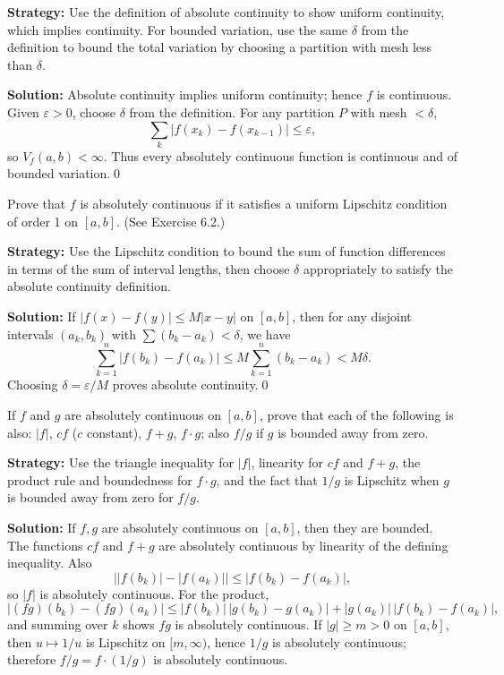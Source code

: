 \noindent\textbf{Strategy:} Use the definition of absolute continuity to show uniform continuity, which implies continuity. For bounded variation, use the same $\delta$ from the definition to bound the total variation by choosing a partition with mesh less than $\delta$.

\bigskip\noindent\textbf{Solution:}
Absolute continuity implies uniform continuity; hence $f$ is continuous. Given $\varepsilon>0$, choose $\delta$ from the definition. For any partition $P$ with mesh $<\delta$,
\[\sum_k |f(x_k)-f(x_{k-1})|\le\varepsilon,\]
so $V_f(a,b)<\infty$. Thus every absolutely continuous function is continuous and of bounded variation.\qed


\begin{problembox}
Prove that $f$ is absolutely continuous if it satisfies a uniform Lipschitz condition of order 1 on $[a, b]$. (See Exercise 6.2.)
\end{problembox}

\noindent\textbf{Strategy:} Use the Lipschitz condition to bound the sum of function differences in terms of the sum of interval lengths, then choose $\delta$ appropriately to satisfy the absolute continuity definition.

\bigskip\noindent\textbf{Solution:}
If $|f(x)-f(y)|\le M|x-y|$ on $[a,b]$, then for any disjoint intervals $(a_k,b_k)$ with $\sum(b_k-a_k)<\delta$, we have
\[\sum_{k=1}^n |f(b_k)-f(a_k)|\le M\sum_{k=1}^n(b_k-a_k)<M\delta.
\]
Choosing $\delta=\varepsilon/M$ proves absolute continuity.\qed


\begin{problembox}
If $f$ and $g$ are absolutely continuous on $[a, b]$, prove that each of the following is also: $|f|$, $cf$ ($c$ constant), $f + g$, $f \cdot g$; also $f/g$ if $g$ is bounded away from zero.
\end{problembox}

\noindent\textbf{Strategy:} Use the triangle inequality for $|f|$, linearity for $cf$ and $f+g$, the product rule and boundedness for $f \cdot g$, and the fact that $1/g$ is Lipschitz when $g$ is bounded away from zero for $f/g$.

\bigskip\noindent\textbf{Solution:}
If $f,g$ are absolutely continuous on $[a,b]$, then they are bounded. The functions $cf$ and $f+g$ are absolutely continuous by linearity of the defining inequality. Also
\[\big||f(b_k)|-|f(a_k)|\big|\le |f(b_k)-f(a_k)|,\]
so $|f|$ is absolutely continuous. For the product,
\[|(fg)(b_k)-(fg)(a_k)|\le |f(b_k)|\,|g(b_k)-g(a_k)|+|g(a_k)|\,|f(b_k)-f(a_k)|,\]
and summing over $k$ shows $fg$ is absolutely continuous. If $|g|\ge m>0$ on $[a,b]$, then $u\mapsto 1/u$ is Lipschitz on $[m,\infty)$, hence $1/g$ is absolutely continuous; therefore $f/g=f\cdot(1/g)$ is absolutely continuous.

